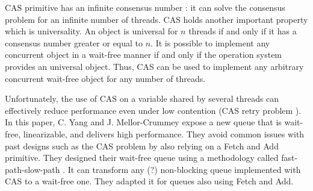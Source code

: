 CAS primitive has an infinite consensus number
\cite{Herlihy:1991:WS:114005.102808} : it can solve the consensus problem for an
infinite number of threads. CAS holds another important property which is
universality. An object is universal for $n$ threads if and only if it has a
consensus number greater or equal to $n$. It is possible to implement any
concurrent object in a wait-free manner if and only if the operation system
provides an universal object. Thus, CAS can be used to implement any arbitrary
concurrent wait-free object for any number of threads.

Unfortunately, the use of CAS on a variable shared by several threads can
effectively reduce performance even under low contention (CAS retry problem
\cite{Morrison:2013:FCQ:2517327.2442527}). In this paper, C. Yang and J.
Mellor-Crummey expose a new queue that is wait-free, linearizable, and delivers
high performance. They avoid common issues with past designs such as the CAS
problem by also relying on a Fetch and Add primitive. They designed their
wait-free queue using a methodology called fast-path-slow-path
\cite{Kogan:2012:MCF:2370036.2145835}. It can transform any (?) non-blocking
queue implemented with CAS to a wait-free one. They adapted it for queues also
using Fetch and Add.
